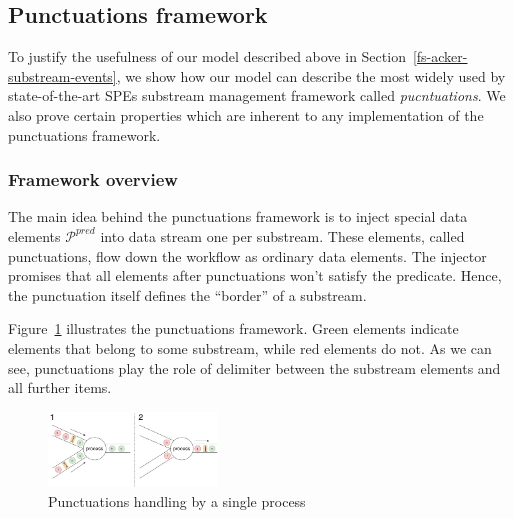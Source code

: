 
\subsection{Punctuations framework}
\label{fs-acker-punctuations}

To justify the usefulness of our model described above in Section~\ref{fs-acker-substream-events}, we show how our model can describe the most widely used by state-of-the-art SPEs substream management framework called {\em pucntuations}. We also prove certain properties which are inherent to any implementation of the punctuations framework. 

\subsubsection{Framework overview}

The main idea behind the punctuations framework is to inject special data elements $\mathcal{P}^{pred}$ into data stream one per substream. These elements, called punctuations, flow down the workflow as ordinary data elements. The injector promises that all elements after punctuations won't satisfy the predicate. Hence, the punctuation itself defines the ``border'' of a substream.

Figure~\ref{punctuations_scheme} illustrates the punctuations framework. Green elements indicate elements that belong to some substream, while red elements do not. As we can see, punctuations play the role of delimiter between the substream elements and all further items.

\begin{figure}[htbp]
  \centering
  \includegraphics[width=0.40\textwidth]{pics/punctuations-scheme.pdf}
  \caption{Punctuations handling by a single process}
  \label{punctuations_scheme}
\end{figure}

